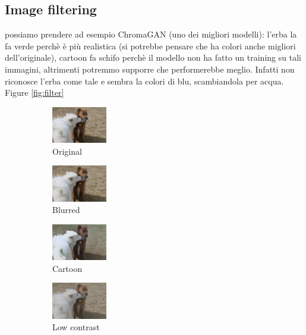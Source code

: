 \subsection{Image filtering}
possiamo prendere ad esempio ChromaGAN (uno dei migliori modelli): l'erba la fa verde perchè è più realistica (si potrebbe pensare che ha colori anche migliori dell'originale), cartoon fa schifo perchè il modello non ha fatto un training su tali immagini, altrimenti potremmo supporre che performerebbe meglio. Infatti non riconosce l'erba come tale e sembra la colori di blu, scambiandola per acqua.
Figure \ref{fig:filter}

\begin{figure}[t]
	\centering
	\captionsetup[subfigure]{labelformat=empty}
		\begin{subfigure}[b]{0.1\textwidth}
		\centering
		\includegraphics[width=2.4cm]{orig - filter.jpeg}
		\caption{Original}
		\end{subfigure}
		\hfill
		\begin{subfigure}[b]{0.1\textwidth}
			\includegraphics[width=2.4cm]{orig - filter - blur.jpeg}
			\caption{Blurred}
		\end{subfigure}
		\hfill
		\begin{subfigure}[b]{0.1\textwidth}
			\includegraphics[width=2.4cm]{orig - filter - cartoon.jpeg}
			\caption{Cartoon}
		\end{subfigure}
		\hfill
		\begin{subfigure}[b]{0.1\textwidth}
			\includegraphics[width=2.4cm]{orig - filter - man contr (2).jpg}
			\caption{Low contrast}
		\end{subfigure}
		\hfill
		\begin{subfigure}[b]{0.1\textwidth}

\end{subfigure}
\end{figure}
